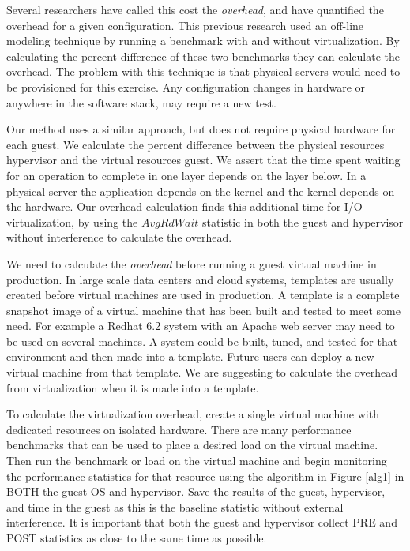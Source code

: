 Several researchers \cite{cherkasova, huber1} have called this cost the \emph{overhead}, and have quantified the overhead for a given configuration.  This previous research used an off-line modeling technique by running a benchmark with and without virtualization.  By calculating the percent difference of these two benchmarks they can calculate the overhead.
The problem with this technique is that physical servers would need to be provisioned for this exercise.  Any configuration changes in hardware or anywhere in the software stack, may require a new test.  

Our method uses a similar approach, but does not require physical hardware for each guest.  We calculate the percent difference between the physical resources hypervisor and the virtual resources guest. 
We assert that the time spent waiting for an operation to complete in one layer depends on the layer below.  
In a physical server the application depends on the kernel and the kernel depends on the hardware.  
Our overhead calculation finds this additional time for I/O virtualization, by using the $AvgRdWait$ statistic in both the guest and hypervisor without interference to calculate the overhead.

We need to calculate the \emph{overhead} before running a guest virtual machine in production. 
In large scale data centers and cloud systems, templates are usually created before virtual machines are used in production.  A template is a complete snapshot image of a virtual machine that has been built and tested to meet some need.  For example a Redhat 6.2 system with an Apache web server may need to be used on several machines.  A system could be built, tuned, and tested for that environment and then made into a template.  Future users can deploy a new virtual machine from that template.  We are suggesting to calculate the overhead from virtualization when it is made into a template.  

To calculate the virtualization overhead, create a single virtual machine with dedicated resources on isolated hardware.  
There are many performance benchmarks that can be used \cite{katcher, tikotekar, hplBench} to place a desired load on the virtual machine. 
Then run the benchmark or load on the virtual machine and begin monitoring the performance statistics for that resource using the algorithm in Figure \ref{alg1} in BOTH the guest OS and hypervisor. 
Save the results of the guest, hypervisor, and time in the guest as this is the baseline statistic without external interference.
It is important that both the guest and hypervisor collect PRE and POST statistics as close to the same time as possible.  

